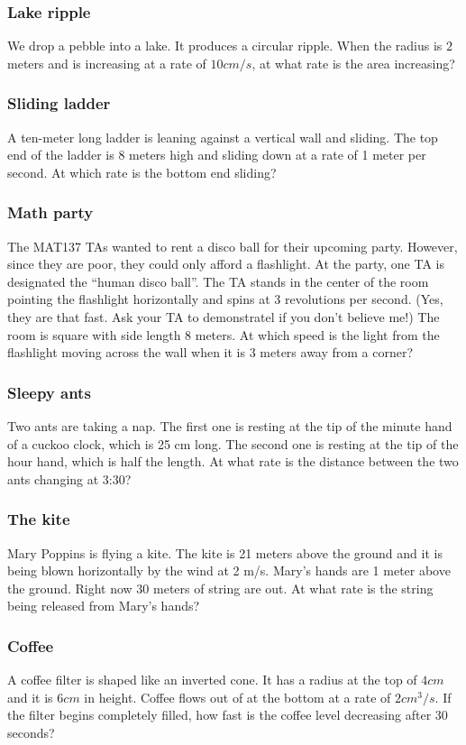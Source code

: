 \documentclass[14pt]{beamer}
\begin{document}
\begin{frame}[t]
	\frametitle{Lake ripple}

	We drop a pebble into a lake. It produces a circular ripple. When the radius
	is $2$ meters and is increasing at a rate of $10cm/s$, at what rate is the area
	increasing?
\end{frame}

\begin{frame}[t]
	\frametitle{Sliding ladder}

	A ten-meter long ladder is leaning against a vertical wall and sliding. The top
	end of the ladder is 8 meters high and sliding down at a rate of 1 meter per second.
	At which rate is the bottom end sliding?
\end{frame}

\begin{frame}[t]
	\frametitle{Math party}

	The MAT137 TAs wanted to rent a disco ball for their upcoming party. However,
	since they are poor, they could only afford a flashlight. At the party, one TA
	is designated the ``human disco ball''. The TA stands in the center of the
	room pointing the flashlight horizontally and spins at 3 revolutions per
	second. (Yes, they are that fast. Ask your TA to demonstratel if you don't
	believe me!) The room is square with side length 8 meters. At which speed is the
	light from the flashlight moving across the wall when it is 3 meters away from
	a corner?
\end{frame}

\begin{frame}[t]
	\frametitle{Sleepy ants}

	Two ants are taking a nap. The first one is resting at the tip of the minute hand
	of a cuckoo clock, which is 25 cm long. The second one is resting at the tip of
	the hour hand, which is half the length. At what rate is the distance between the
	two ants changing at 3:30?
\end{frame}

\begin{frame}[t]
	\frametitle{The kite}

	Mary Poppins is flying a kite. The kite is 21 meters above the ground and it is
	being blown horizontally by the wind at 2 m/s. Mary's hands are 1 meter above
	the ground. Right now 30 meters of string are out. At what rate is the string
	being released from Mary's hands?
\end{frame}

\begin{frame}[t]
	\frametitle{Coffee}

	A coffee filter is shaped like an inverted cone. It has a radius at the top of
	$4cm$ and it is $6cm$ in height. Coffee flows out of at the bottom at a rate
	of $2cm^{3}/s$. If the filter begins completely filled, how fast is the coffee
	level decreasing after 30 seconds?
\end{frame}
\end{document}
